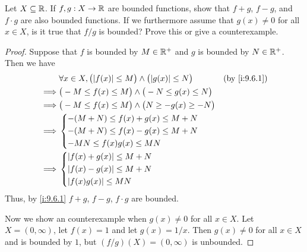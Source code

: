 \begin{ex}\label{i:ex:9.6.2}
  Let \(X \subseteq \mathbb{R}\).
  If \(f, g: X \to \mathbb{R}\) are bounded functions, show that \(f + g\), \(f - g\), and \(f \cdot g\) are also bounded functions.
  If we furthermore assume that \(g(x) \neq 0\) for all \(x \in X\), is it true that \(f / g\) is bounded?
  Prove this or give a counterexample.
\end{ex}

\begin{proof}
  Suppose that \(f\) is bounded by \(M \in \mathbb{R}^+\) and \(g\) is bounded by \(N \in \mathbb{R}^+\).
  Then we have
  \begin{align*}
             & \forall x \in X, \big(\abs{f(x)} \leq M\big) \land \big(\abs{g(x)} \leq N\big) &  & \by{i:9.6.1} \\
    \implies & \big(-M \leq f(x) \leq M\big) \land \big(-N \leq g(x) \leq N\big)                                \\
    \implies & \big(-M \leq f(x) \leq M\big) \land \big(N \geq -g(x) \geq -N\big)                               \\
    \implies & \begin{dcases}
                 -(M + N) \leq f(x) + g(x) \leq M + N \\
                 -(M + N) \leq f(x) - g(x) \leq M + N \\
                 -MN \leq f(x) g(x) \leq MN
               \end{dcases}                                                             \\
    \implies & \begin{dcases}
                 \abs{f(x) + g(x)} \leq M + N \\
                 \abs{f(x) - g(x)} \leq M + N \\
                 \abs{f(x) g(x)} \leq MN
               \end{dcases}
  \end{align*}
  Thus, by \cref{i:9.6.1} \(f + g\), \(f - g\), \(f \cdot g\) are bounded.

  Now we show an counterexample when \(g(x) \neq 0\) for all \(x \in X\).
  Let \(X = (0, \infty)\), let \(f(x) = 1\) and let \(g(x) = 1 / x\).
  Then \(g(x) \neq 0\) for all \(x \in X\) and is bounded by \(1\), but \((f / g)(X) = (0, \infty)\) is unbounded.
\end{proof}
